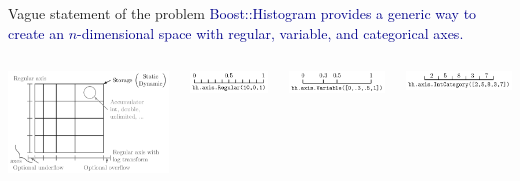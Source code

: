 \documentclass[aspectratio=169]{beamer}
\begin{document}
\begin{frame}{Vague statement of the problem}
\vspace{0.5 cm}
\Large
\textcolor{darkblue}{Boost::Histogram provides a generic way to create an $n$-dimensional space with regular, variable, and categorical axes.}

\vspace{0.5 cm}
\begin{columns}
\includegraphics[width=\linewidth]{histogram_design.png}

\includegraphics[width=\linewidth]{axis_regular.png}

\vspace{0.35 cm}
\includegraphics[width=\linewidth]{axis_variable.png}

\vspace{0.35 cm}
\includegraphics[width=\linewidth]{axis_category.png}
\end{columns}
\end{frame}
\end{document}
